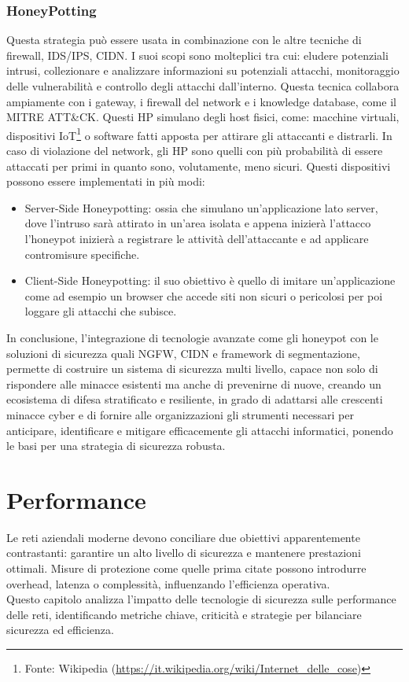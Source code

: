             \subsubsection{HoneyPotting}
                Questa strategia può essere usata in combinazione con le altre tecniche di firewall, IDS/IPS, CIDN.
                I suoi scopi sono molteplici tra cui: eludere potenziali intrusi, collezionare e analizzare informazioni su potenziali attacchi, monitoraggio delle vulnerabilità e controllo degli attacchi dall'interno. Questa tecnica collabora ampiamente con i gateway, i firewall del network e i knowledge database, come il MITRE ATT\&CK.
                Questi HP simulano degli host fisici, come: macchine virtuali, dispositivi IoT\footnote{Fonte: Wikipedia (\url{https://it.wikipedia.org/wiki/Internet_delle_cose})} o software fatti apposta per attirare gli attaccanti e distrarli. In caso di violazione del network, gli HP sono quelli con più probabilità di essere attaccati per primi in quanto sono, volutamente, meno sicuri.
                Questi dispositivi possono essere implementati in più modi:
                \begin{itemize}
                    \item Server-Side Honeypotting: ossia che simulano un'applicazione lato server, dove l'intruso sarà attirato in un'area isolata e appena inizierà l'attacco l'honeypot inizierà a registrare le attività dell'attaccante e ad applicare contromisure specifiche.
                    \item Client-Side Honeypotting: il suo obiettivo è quello di imitare un'applicazione come ad esempio un browser che accede siti non sicuri o pericolosi per poi loggare gli attacchi che subisce.
                \end{itemize}

                In conclusione, l'integrazione di tecnologie avanzate come gli honeypot con le soluzioni di sicurezza quali NGFW, CIDN e framework di segmentazione, permette di costruire un sistema di sicurezza multi livello, capace non solo di rispondere alle minacce esistenti ma anche di prevenirne di nuove, creando un ecosistema di difesa stratificato e resiliente, in grado di adattarsi alle crescenti minacce cyber e di fornire alle organizzazioni gli strumenti necessari per anticipare, identificare e mitigare efficacemente gli attacchi informatici, ponendo le basi per una strategia di sicurezza robusta.

        \section{Performance}
            Le reti aziendali moderne devono conciliare due obiettivi apparentemente contrastanti: garantire un alto livello di sicurezza e mantenere prestazioni ottimali. Misure di protezione come quelle prima citate possono introdurre overhead, latenza o complessità, influenzando l'efficienza operativa.\\
            Questo capitolo analizza l'impatto delle tecnologie di sicurezza sulle performance delle reti, identificando metriche chiave, criticità e strategie per bilanciare sicurezza ed efficienza.

